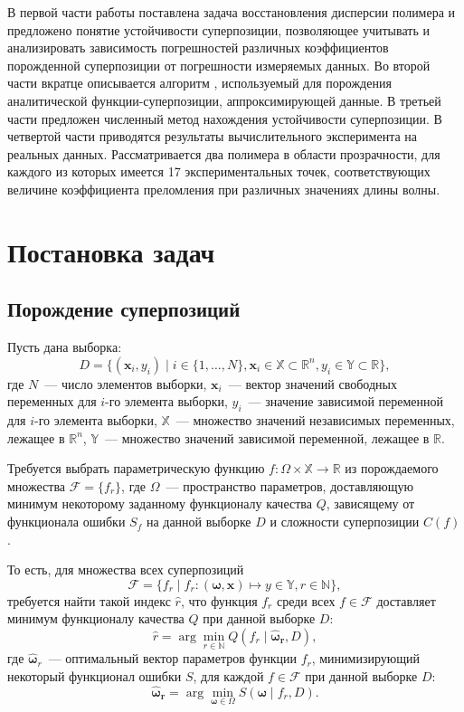 \documentclass[12pt,a4paper]{article}
\begin{document}
В первой части работы поставлена задача восстановления дисперсии полимера и
предложено понятие устойчивости суперпозиции, позволяющее учитывать и анализировать
зависимость погрешностей различных коэффициентов порожденной суперпозиции от
погрешности измеряемых данных.
Во второй части вкратце описывается алгоритм \cite{Rudoy13},
используемый для порождения аналитической функции-суперпозиции, аппроксимирующей
данные. В третьей части предложен численный метод нахождения устойчивости
суперпозиции. В четвертой части приводятся результаты вычислительного
эксперимента на реальных данных. Рассматривается два полимера в области прозрачности,
для каждого из которых имеется 17 экспериментальных точек,
соответствующих величине коэффициента преломления при различных значениях длины волны.

\section{Постановка задач}

\subsection{Порождение суперпозиций}

Пусть дана выборка:
\[
D = \{ (\mathbf{x}_i, y_i) \mid i \in \{1, \dots, N\},
			\mathbf{x}_i \in \mathbb{X} \subset \mathbb{R}^n,
			y_i \in \mathbb{Y} \subset \mathbb{R} \},
\]
где $N$~--- число элементов выборки, $\mathbf{x}_i$~--- вектор значений
свободных переменных для $i$-го элемента выборки, $y_i$~--- значение зависимой
переменной для $i$-го элемента выборки,
$\mathbb{X}$~--- множество значений независимых переменных, лежащее в
$\mathbb{R}^n$, $\mathbb{Y}$~--- множество значений зависимой переменной,
лежащее в $\mathbb{R}$.

Требуется выбрать параметрическую функцию
$f : \Omega \times \mathbb{X} \rightarrow \mathbb{R}$ из
порождаемого множества $\mathcal{F} = \{ f_r \}$, где $\Omega$~--- пространство
параметров, доставляющую минимум некоторому заданному функционалу качества $Q$,
зависящему от функционала ошибки $S_f$ на данной выборке $D$ и сложности суперпозиции $C(f)$.

То есть, для множества всех суперпозиций
\[
\mathcal{F} = \{ f_r \mid
			f_r : (\boldsymbol{\omega}, \mathbf{x}) \mapsto y \in \mathbb{Y},
			r \in \mathbb{N} \},
\]
требуется найти такой индекс $\hat{r}$, что функция $f_r$ среди всех
$f \in \mathcal{F}$ доставляет минимум функционалу качества $Q$ при данной
выборке $D$:
\begin{equation}
  \label{eq:hat_r}
  \hat{r} = \arg \min_{r \in \mathbb{N}} Q (f_r \mid \boldsymbol{\hat{\omega}_r}, D),
\end{equation}
где $\boldsymbol{\hat{\omega}}_r$~--- оптимальный вектор параметров функции
$f_r$, минимизирующий некоторый функционал ошибки $S$, для каждой $f \in \mathcal{F}$ при данной выборке $D$:
\begin{equation}
  \label{eq:hat_omega_generate}
  \boldsymbol{\hat{\omega}_r} = \arg \min_{\boldsymbol{\omega} \in \Omega} S(\boldsymbol{\omega} \mid f_r, D).
\end{equation}
\end{document}
